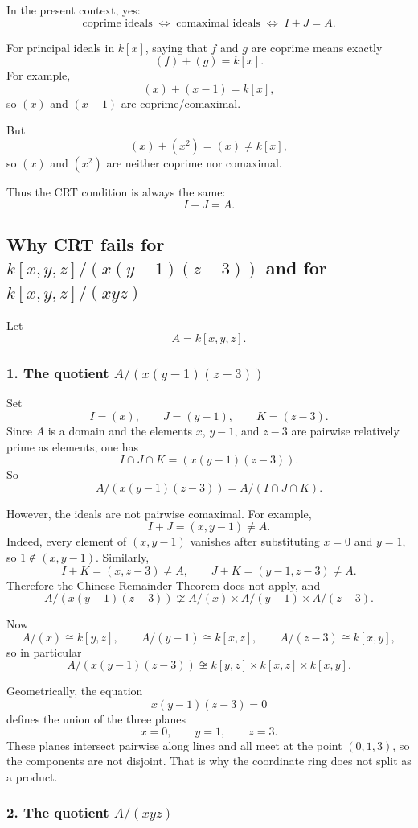 \documentclass[12pt,a4paper]{article}
\theoremstyle{notespace}
\begin{document}
In the present context, yes:
\[
\text{coprime ideals} \;\Longleftrightarrow\; \text{comaximal ideals}
\;\Longleftrightarrow\; I+J=A.
\]

For principal ideals in \(k[x]\), saying that \(f\) and \(g\) are coprime means exactly
\[
(f)+(g)=k[x].
\]
For example,
\[
(x)+(x-1)=k[x],
\]
so \((x)\) and \((x-1)\) are coprime/comaximal.

But
\[
(x)+(x^2)=(x)\neq k[x],
\]
so \((x)\) and \((x^2)\) are neither coprime nor comaximal.

Thus the CRT condition is always the same:
\[
I+J=A.
\]

\subsection{Why CRT fails for \(k[x,y,z]/(x(y-1)(z-3))\) and for \(k[x,y,z]/(xyz)\)}

Let
\[
A=k[x,y,z].
\]

\subsubsection*{1. The quotient \(A/(x(y-1)(z-3))\)}

Set
\[
I=(x), \qquad J=(y-1), \qquad K=(z-3).
\]
Since \(A\) is a domain and the elements \(x\), \(y-1\), and \(z-3\) are pairwise relatively prime as elements, one has
\[
I\cap J\cap K=(x(y-1)(z-3)).
\]
So
\[
A/(x(y-1)(z-3)) = A/(I\cap J\cap K).
\]

However, the ideals are not pairwise comaximal.
For example,
\[
I+J=(x,y-1)\neq A.
\]
Indeed, every element of \((x,y-1)\) vanishes after substituting \(x=0\) and \(y=1\), so \(1\notin (x,y-1)\).
Similarly,
\[
I+K=(x,z-3)\neq A,
\qquad
J+K=(y-1,z-3)\neq A.
\]
Therefore the Chinese Remainder Theorem does not apply, and
\[
A/(x(y-1)(z-3))
\not\cong
A/(x)\times A/(y-1)\times A/(z-3).
\]

Now
\[
A/(x)\cong k[y,z],\qquad
A/(y-1)\cong k[x,z],\qquad
A/(z-3)\cong k[x,y],
\]
so in particular
\[
A/(x(y-1)(z-3))
\not\cong
k[y,z]\times k[x,z]\times k[x,y].
\]

Geometrically, the equation
\[
x(y-1)(z-3)=0
\]
defines the union of the three planes
\[
x=0,\qquad y=1,\qquad z=3.
\]
These planes intersect pairwise along lines and all meet at the point \((0,1,3)\), so the components are not disjoint.
That is why the coordinate ring does not split as a product.

\subsubsection*{2. The quotient \(A/(xyz)\)}
\end{document}
